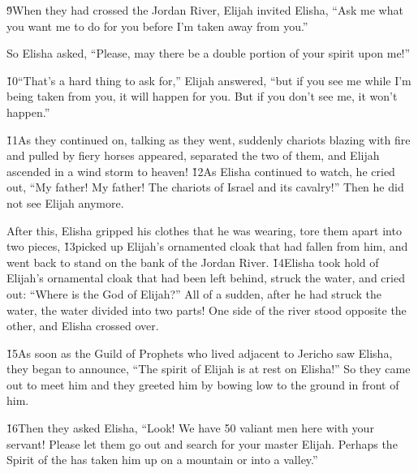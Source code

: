 \v{9}When they had crossed the Jordan River, Elijah invited Elisha, ``Ask me what you want me to do for you before I'm taken away from you.''

So Elisha asked, ``Please, may there be a double portion of your spirit upon me!''

\v{10}``That's a hard thing to ask for,'' Elijah answered, ``but if you see me while I'm being taken from you, it will happen for you. But if you don't see me, it won't happen.''

\v{11}As they continued on, talking as they went, suddenly chariots blazing with fire and pulled by fiery horses appeared, separated the two of them, and Elijah ascended in a wind storm to heaven! \v{12}As Elisha continued to watch, he cried out, ``My father! My father! The chariots of Israel and its cavalry!'' Then he did not see Elijah anymore.

After this, Elisha gripped his clothes that he was wearing, tore them apart into two pieces, \v{13}picked up Elijah's ornamented cloak that had fallen from him, and went back to stand on the bank of the Jordan River. \v{14}Elisha took hold of Elijah's ornamental cloak that had been left behind, struck the water, and cried out: ``Where is the  God of Elijah?'' All of a sudden, after he had struck the water, the water divided into two parts! One side of the river stood opposite the other, and Elisha crossed over.

\v{15}As soon as the Guild of Prophets who lived adjacent to Jericho saw Elisha, they began to announce, ``The spirit of Elijah is at rest on Elisha!'' So they came out to meet him and they greeted him by bowing low to the ground in front of him.

\v{16}Then they asked Elisha, ``Look! We have 50 valiant men here with your servant! Please let them go out and search for your master Elijah. Perhaps the Spirit of the  has taken him up on a mountain or into a valley.''

